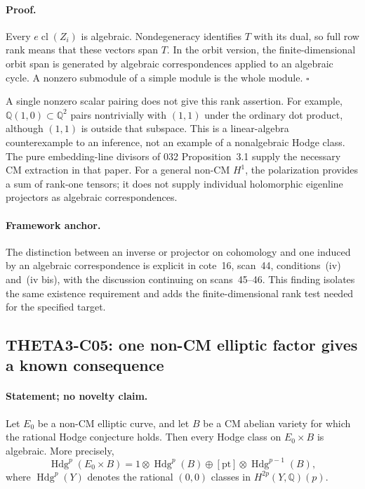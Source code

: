 \documentclass[11pt]{article}
\newcommand{\Q}{\mathbb Q}\newcommand{\C}{\mathbb C}\newcommand{\Z}{\mathbb Z}\newcommand{\R}{\mathbb R}\newcommand{\A}{\mathbb A}\newcommand{\OO}{\mathcal O}
\newcommand{\Hdg}{\operatorname{Hdg}}\newcommand{\CH}{\operatorname{CH}}\newcommand{\Hom}{\operatorname{Hom}}\newcommand{\Tr}{\operatorname{Tr}}\newcommand{\SU}{\operatorname{SU}}\newcommand{\U}{\operatorname{U}}
\theoremstyle{definition}\newtheorem{definition}[theorem]{Definition}\newtheorem{remark}[theorem]{Remark}
\begin{document}
\paragraph{Proof.}
Every $e\operatorname{cl}(Z_i)$ is algebraic. Nondegeneracy
identifies $T$ with its dual, so full row rank means that these
vectors span $T$. In the orbit version, the finite-dimensional
orbit span is generated by algebraic correspondences applied to an
algebraic cycle. A nonzero submodule of a simple module is the whole
module. $\square$

A single nonzero scalar pairing does not give this rank assertion.
For example, $\Q(1,0)\subset\Q^2$ pairs nontrivially with $(1,1)$
under the ordinary dot product, although $(1,1)$ is outside that
subspace. This is a linear-algebra counterexample to an inference,
not an example of a nonalgebraic Hodge class. The pure embedding-line
divisors of 032 Proposition~3.1 supply the necessary CM extraction
in that paper. For a general non-CM $H^1$, the polarization provides
a sum of rank-one tensors; it does not supply individual
holomorphic eigenline projectors as algebraic correspondences.

\paragraph{Framework anchor.}
The distinction between an inverse or projector on cohomology and one
induced by an algebraic correspondence is explicit in cote~16,
scan~44, conditions~(iv) and~(iv bis), with the discussion continuing on
scans~45--46.  This finding isolates the same existence requirement and
adds the finite-dimensional rank test needed for the specified target.

\subsection{THETA3-C05: one non-CM elliptic factor gives a known consequence}\label{C05}

\paragraph{Statement; no novelty claim.}
Let $E_0$ be a non-CM elliptic curve, and let $B$ be a CM abelian
variety for which the rational Hodge conjecture holds. Then every
Hodge class on $E_0\times B$ is algebraic. More precisely,
\[
 \Hdg^p(E_0\times B)
 =1\otimes\Hdg^p(B)
 \oplus[\mathrm{pt}]\otimes\Hdg^{p-1}(B),
\]
where $\Hdg^p(Y)$ denotes the rational $(0,0)$ classes in
$H^{2p}(Y,\Q)(p)$.
\end{document}

